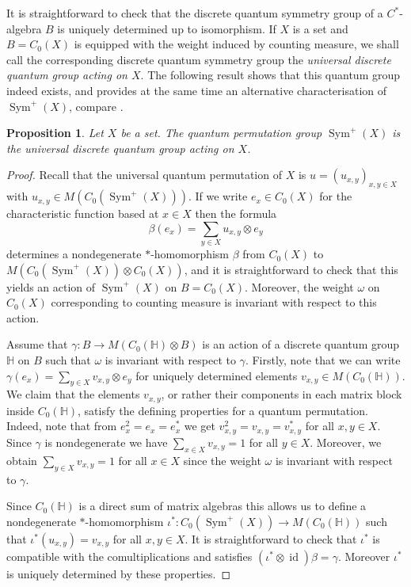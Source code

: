 \documentclass[a4paper]{amsart}
\newcommand{\HH}{\mathbb{H}}
\DeclareMathOperator{\id}{id}
\DeclareMathOperator{\Sym}{Sym}
\numberwithin{equation}{section}
\theoremstyle{change}
\newtheorem{prop}[theorem]{Proposition}
\begin{document}
It is straightforward to check that the discrete quantum symmetry group of a $ C^* $-algebra $ B $ is uniquely determined up to isomorphism. 
If $ X $ is a set and $ B = C_0(X) $ is equipped with the weight induced by counting measure, we shall call the corresponding discrete quantum symmetry group 
the \emph{universal discrete quantum group acting on $ X $}. The following result shows that this quantum group indeed exists, and provides at the same time an alternative characterisation of $ \Sym^+(X) $, compare \cite[Proposition 4.6]{VOIGT_infinitequantumpermutations}. 

\begin{prop} \label{quantumsymmetryuniversal}
Let $ X $ be a set. The quantum permutation group $ \Sym^+(X) $ is the universal discrete quantum group acting on $ X $. 
\end{prop} 

\begin{proof} 
Recall that the universal quantum permutation of $ X $ is $ u = (u_{x,y})_{x,y \in X} $ with $ u_{x,y} \in M(C_0(\Sym^+(X))) $.
If we write $ e_x \in C_0(X) $ for the characteristic function based at $ x \in X $ then the formula 
$$ 
\beta(e_x) = \sum_{y \in X} u_{x,y} \otimes e_y 
$$ 
determines a nondegenerate $ * $-homomorphism  $ \beta $ from $ C_0(X) $ to $ M(C_0(\Sym^+(X)) \otimes C_0(X)) $, and it is straightforward to check that this yields an action of $ \Sym^+(X) $ on $ B = C_0(X) $. Moreover, the weight $ \omega $ on $ C_0(X) $ corresponding to counting measure is invariant with respect to this action. 

Assume that $ \gamma: B \rightarrow M(C_0(\HH) \otimes B) $ is an action of a discrete quantum group $ \HH $ on $ B $ such that $ \omega $ is invariant with respect to $ \gamma $. Firstly, note that we can 
write $ \gamma(e_x) = \sum_{y \in X} v_{x,y} \otimes e_y $ for uniquely determined elements $ v_{x,y} \in M(C_0(\HH)) $. We claim that the elements $ v_{x,y} $, 
or rather their components in each matrix block inside $ C_0(\HH) $, satisfy the defining properties for a quantum permutation. Indeed, note that 
from $ e_x^2 = e_x = e_x^* $ we get $ v_{x,y}^2 = v_{x,y} = v_{x,y}^* $ for all $ x,y \in X $. 
Since $ \gamma $ is nondegenerate we have $ \sum_{x \in X} v_{x,y} = 1 $ for all $ y \in X $. 
Moreover, we obtain $ \sum_{y \in X} v_{x,y} = 1 $ for all $ x \in X $ since the weight $ \omega $ is invariant with respect to $ \gamma $. 

Since $ C_0(\HH) $ is a direct sum of matrix algebras this allows us to define a nondegenerate $ * $-homomorphism $ \iota^*: C_0(\Sym^+(X)) \rightarrow M(C_0(\HH)) $ 
such that $ \iota^*(u_{x,y}) = v_{x,y} $ for all $ x, y \in X $. It is straightforward to check that $ \iota^* $ is compatible with the comultiplications 
and satisfies $ (\iota^* \otimes \id) \beta = \gamma $. Moreover $ \iota^* $ is uniquely determined by these properties. 
\end{proof} 
\end{document}
